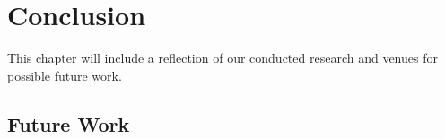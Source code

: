 \chapter{Conclusion}
\label{chapter:conclusion}

This chapter will include a reflection of our conducted research and venues
for possible future work.

\section{Future Work}



